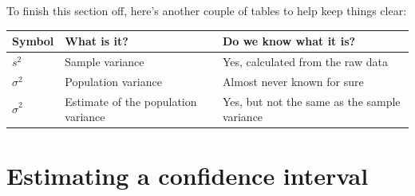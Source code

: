 \documentclass[]{book}
\begin{document}
To finish this section off, here's another couple of tables to help keep things clear:

\begin{longtable}[]{@{}lll@{}}
\toprule
\begin{minipage}[b]{0.27\columnwidth}\raggedright
Symbol\strut
\end{minipage} & \begin{minipage}[b]{0.32\columnwidth}\raggedright
What is it?\strut
\end{minipage} & \begin{minipage}[b]{0.32\columnwidth}\raggedright
Do we know what it is?\strut
\end{minipage}\tabularnewline
\midrule
\endhead
\begin{minipage}[t]{0.27\columnwidth}\raggedright
\(s^2\)\strut
\end{minipage} & \begin{minipage}[t]{0.32\columnwidth}\raggedright
Sample variance\strut
\end{minipage} & \begin{minipage}[t]{0.32\columnwidth}\raggedright
Yes, calculated from the raw data\strut
\end{minipage}\tabularnewline
\begin{minipage}[t]{0.27\columnwidth}\raggedright
\(\sigma^2\)\strut
\end{minipage} & \begin{minipage}[t]{0.32\columnwidth}\raggedright
Population variance\strut
\end{minipage} & \begin{minipage}[t]{0.32\columnwidth}\raggedright
Almost never known for sure\strut
\end{minipage}\tabularnewline
\begin{minipage}[t]{0.27\columnwidth}\raggedright
\(\hat{\sigma}^2\)\strut
\end{minipage} & \begin{minipage}[t]{0.32\columnwidth}\raggedright
Estimate of the population variance\strut
\end{minipage} & \begin{minipage}[t]{0.32\columnwidth}\raggedright
Yes, but not the same as the sample variance\strut
\end{minipage}\tabularnewline
\bottomrule
\end{longtable}

\hypertarget{estimating-a-confidence-interval}{%
\section{Estimating a confidence interval}\label{estimating-a-confidence-interval}}
\end{document}

